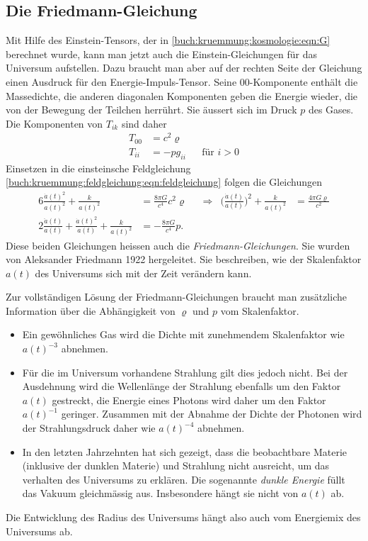 \subsection{Die Friedmann-Gleichung}
Mit Hilfe des Einstein-Tensors, der in \eqref{buch:kruemmung:kosmologie:eqn:G}
berechnet wurde, kann man jetzt auch die Einstein-Gleichungen
für das Universum aufstellen.
Dazu braucht man aber auf der rechten Seite der Gleichung einen 
Ausdruck für den Energie-Impuls-Tensor.
Seine $00$-Komponente enthält die Massedichte, die anderen diagonalen
Komponenten geben die Energie wieder, die von der Bewegung der
Teilchen herrührt.
Sie äussert sich im Druck $p$ des Gases.
Die Komponenten von $T_{ik}$ sind daher
\begin{equation}
\begin{aligned}
T_{00} &= c^2 \varrho 
\\
T_{ii} &= -p g_{ii}&&\text{für $i>0$}
\end{aligned}
\end{equation}
Einsetzen in die einsteinsche Feldgleichung
\eqref{buch:kruemmung:feldgleichung:eqn:feldgleichung}
folgen die Gleichungen
\begin{align*}
6
\frac{\dot{a}(t)^2}{a(t)^2} 
+\frac{k}{a(t)^2}
&=
\frac{8\pi G}{c^4}c^2\varrho
&&\Rightarrow&
\biggl(\frac{\dot{a}(t)}{a(t)}\biggr)^2
+
\frac{k}{a(t)^2}
&=\frac{4\pi G\varrho}{c^2}
\\
2
\frac{\ddot{a}(t)}{a(t)}
+
\frac{\dot{a}(t)^2}{a(t)}
+
\frac{k}{a(t)^2}
&=
-\frac{8\pi G}{c^4}p.
\end{align*}
Diese beiden Gleichungen heissen auch die 
\emph{Friedmann-Gleichungen}.
Sie wurden von Aleksander Friedmann 1922 hergeleitet.
Sie beschreiben, wie der Skalenfaktor $a(t)$ des Universums sich
mit der Zeit verändern kann.

Zur vollständigen Lösung der Friedmann-Gleichungen braucht man 
zusätzliche Information über die Abhängigkeit von $\varrho$
und $p$ vom Skalenfaktor.
\begin{itemize}
\item
Ein gewöhnliches Gas wird die Dichte mit zunehmendem Skalenfaktor
wie $a(t)^{-3}$ abnehmen.
\item
Für die im Universum vorhandene Strahlung gilt dies jedoch nicht.
Bei der Ausdehnung wird die Wellenlänge der Strahlung ebenfalls um
den Faktor $a(t)$ gestreckt, die Energie eines Photons wird daher
um den Faktor $a(t)^{-1}$ geringer.
Zusammen mit der Abnahme der Dichte der Photonen wird der
Strahlungsdruck daher wie $a(t)^{-4}$ abnehmen.
\item
In den letzten Jahrzehnten hat sich gezeigt, dass die beobachtbare
Materie (inklusive der dunklen Materie) und Strahlung nicht ausreicht,
um das verhalten des Universums zu erklären.
Die sogenannte \emph{dunkle Energie} füllt das Vakuum gleichmässig
aus.
Insbesondere hängt sie nicht von $a(t)$ ab.
%
\end{itemize}
Die Entwicklung des Radius des Universums hängt also auch vom Energiemix
des Universums ab.

